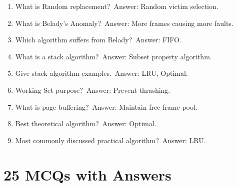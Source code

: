 \begin{enumerate}
\item What is Random replacement?\
Answer: Random victim selection.

\item What is Belady's Anomaly?\
Answer: More frames causing more faults.

\item Which algorithm suffers from Belady?\
Answer: FIFO.

\item What is a stack algorithm?\
Answer: Subset property algorithm.

\item Give stack algorithm examples.\
Answer: LRU, Optimal.

\item Working Set purpose?\
Answer: Prevent thrashing.

\item What is page buffering?\
Answer: Maintain free-frame pool.

\item Best theoretical algorithm?\
Answer: Optimal.

\item Most commonly discussed practical algorithm?\
Answer: LRU.
\end{enumerate}

\section{25 MCQs with Answers}


